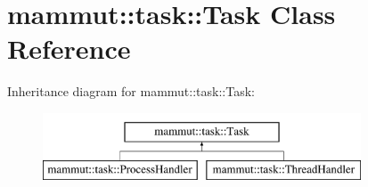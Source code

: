 \hypertarget{classmammut_1_1task_1_1Task}{\section{mammut\-:\-:task\-:\-:Task Class Reference}
\label{classmammut_1_1task_1_1Task}
}
Inheritance diagram for mammut\-:\-:task\-:\-:Task\-:\begin{figure}[H]
\begin{center}
\leavevmode
\includegraphics[height=2.000000cm]{classmammut_1_1task_1_1Task}
\end{center}
\end{figure}
